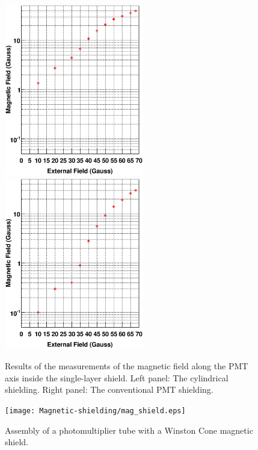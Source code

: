  \begin{figure}
 \vspace{1.cm}
 \begin{centering}
  \includegraphics[height=7.5cm,angle=0]{Magnetic-shielding/magshield1.eps}
 \includegraphics[height=7.5cm,angle=0]{Magnetic-shielding/magshield2.eps}
 \hspace{0.1cm}
 \caption{\small{Results of the measurements of the magnetic field along 
the PMT axis inside the single-layer shield.  Left panel: The cylindrical 
shielding.  Right panel: The conventional PMT shielding.}}
\label{magshield1}
 \end{centering}
 \end{figure}

\begin{figure}
\hspace{0.5cm}
\begin{centering}
\texttt{[image: Magnetic-shielding/mag\_shield.eps]}
\vspace{0.5cm}
\caption{\small{Assembly of a photomultiplier tube with a Winston Cone 
magnetic shield.}}
\label{prototype-shielding}
\end{centering}
\end{figure}


